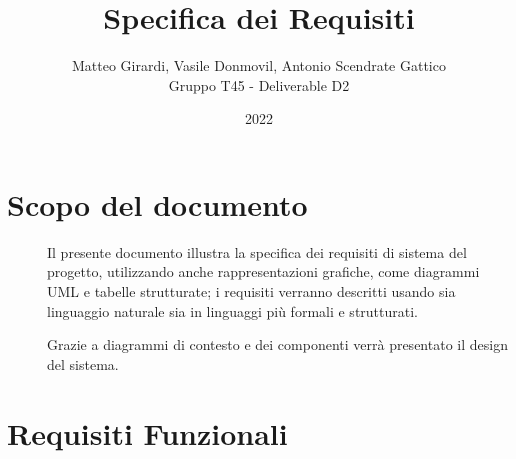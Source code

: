 \documentclass{article}
\title{\textbf{\Huge Specifica dei Requisiti}}
\author{Matteo Girardi, Vasile Donmovil, Antonio Scendrate Gattico \\ Gruppo T45 - Deliverable D2}
\date{2022}
\begin{document}
\maketitle

\clearpage
\tableofcontents
\clearpage

\section{Scopo del documento}
\begin{description}
    \item[] Il presente documento illustra la specifica dei requisiti di sistema del progetto, utilizzando anche rappresentazioni grafiche, come diagrammi UML e tabelle strutturate; i requisiti verranno descritti usando sia linguaggio naturale sia in linguaggi più formali e strutturati.
    \item[] Grazie a diagrammi di contesto e dei componenti verrà presentato il design del sistema.
\end{description}
\clearpage

\section{Requisiti Funzionali}
\end{document}
